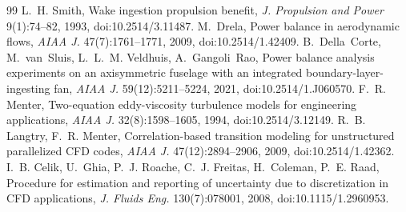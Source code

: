 \documentclass[11pt,a4paper]{article}
\begin{document}
\begin{thebibliography}{99}
 L.~H. Smith, Wake ingestion propulsion benefit, \emph{J. Propulsion and
Power} 9(1):74--82, 1993, doi:10.2514/3.11487.
 M.~Drela, Power balance in aerodynamic flows, \emph{AIAA J.} 47(7):1761--1771, 2009, doi:10.2514/1.42409.
 B.~Della~Corte, M.~van~Sluis, L.~L.~M. Veldhuis, A.~Gangoli~Rao,
Power balance analysis experiments on an axisymmetric fuselage with an integrated
boundary-layer-ingesting fan, \emph{AIAA J.} 59(12):5211--5224, 2021, doi:10.2514/1.J060570.
 F.~R. Menter, Two-equation eddy-viscosity turbulence models for
engineering applications, \emph{AIAA J.} 32(8):1598--1605, 1994, doi:10.2514/3.12149.
 R.~B. Langtry, F.~R. Menter, Correlation-based transition modeling
for unstructured parallelized CFD codes, \emph{AIAA J.} 47(12):2894--2906, 2009,
doi:10.2514/1.42362.
 I.~B. Celik, U.~Ghia, P.~J. Roache, C.~J. Freitas, H.~Coleman, P.~E. Raad,
Procedure for estimation and reporting of uncertainty due to discretization in CFD
applications, \emph{J. Fluids Eng.} 130(7):078001, 2008, doi:10.1115/1.2960953.
\end{thebibliography}
\end{document}
